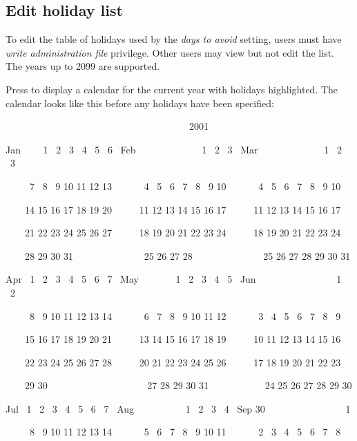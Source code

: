 \subsection{Edit holiday list}
To edit the table of holidays used by the \textit{days to avoid}
setting, users must have \textit{write administration file} privilege.
Other users may view but not edit the list. The years up to 2099 are
supported.

Press  to display a calendar for the current
year with holidays highlighted. The calendar looks like this before any
holidays have been specified:

\begin{exparasmall}

\ \ \ \ \ \ \ \ \ \ \ \ \ \ \ \ \ \ \ \ \ \ \ \ \ \ \ \ \ \ \ \ \ \ \ \ \ \ 2001

\bigskip


Jan \ \ \ \ 1 \ 2 \ 3 \ 4 \ 5 \ 6 \ Feb \ \ \ \ \ \ \ \ \ \ \ \ \ 1 \ 2
\ 3 \ Mar \ \ \ \ \ \ \ \ \ \ \ \ \ 1 \ 2 \ 3

\ \ \ \ \ 7 \ 8 \ 9 10 11 12 13 \ \ \ \ \ \ 4 \ 5 \ 6 \ 7 \ 8 \ 9 10
\ \ \ \ \ \ 4 \ 5 \ 6 \ 7 \ 8 \ 9 10

\ \ \ \ 14 15 16 17 18 19 20 \ \ \ \ \ 11 12 13 14 15 16 17 \ \ \ \ \ 11
12 13 14 15 16 17

\ \ \ \ 21 22 23 24 25 26 27 \ \ \ \ \ 18 19 20 21 22 23 24 \ \ \ \ \ 18
19 20 21 22 23 24

\ \ \ \ 28 29 30 31 \ \ \ \ \ \ \ \ \ \ \ \ \ \ 25 26 27 28
\ \ \ \ \ \ \ \ \ \ \ \ \ \ 25 26 27 28 29 30 31

Apr \ 1 \ 2 \ 3 \ 4 \ 5 \ 6 \ 7 \ May \ \ \ \ \ \ \ 1 \ 2 \ 3 \ 4 \ 5
\ Jun \ \ \ \ \ \ \ \ \ \ \ \ \ \ \ \ 1 \ 2

\ \ \ \ \ 8 \ 9 10 11 12 13 14 \ \ \ \ \ \ 6 \ 7 \ 8 \ 9 10 11 12
\ \ \ \ \ \ 3 \ 4 \ 5 \ 6 \ 7 \ 8 \ 9

\ \ \ \ 15 16 17 18 19 20 21 \ \ \ \ \ 13 14 15 16 17 18 19 \ \ \ \ \ 10
11 12 13 14 15 16

\ \ \ \ 22 23 24 25 26 27 28 \ \ \ \ \ 20 21 22 23 24 25 26 \ \ \ \ \ 17
18 19 20 21 22 23

\ \ \ \ 29 30 \ \ \ \ \ \ \ \ \ \ \ \ \ \ \ \ \ \ \ \ 27 28 29 30 31
\ \ \ \ \ \ \ \ \ \ \ 24 25 26 27 28 29 30

Jul \ 1 \ 2 \ 3 \ 4 \ 5 \ 6 \ 7 \ Aug \ \ \ \ \ \ \ \ \ \ 1 \ 2 \ 3 \ 4
\ Sep 30 \ \ \ \ \ \ \ \ \ \ \ \ \ \ \ \ 1

\ \ \ \ \ 8 \ 9 10 11 12 13 14 \ \ \ \ \ \ 5 \ 6 \ 7 \ 8 \ 9 10 11
\ \ \ \ \ \ 2 \ 3 \ 4 \ 5 \ 6 \ 7 \ 8


\end{exparasmall}
